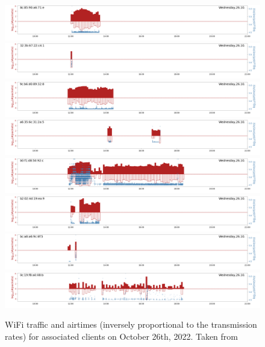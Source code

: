  \begin{figure}
      \includegraphics[width=\textwidth]{figures/Appendix/a.png}
      \includegraphics[width=\textwidth]{figures/Appendix/d299_32:3b:67:22:c4:1_pkts_shft.png}
      \includegraphics[width=\textwidth]{figures/Appendix/d299_9c:b6:d0:89:32:8_pkts_shft.png}
      \includegraphics[width=\textwidth]{figures/Appendix/d299_a6:35:6c:31:2a:5_pkts_shft.png}
      \includegraphics[width=\textwidth]{figures/Appendix/d299_b0:f1:d8:50:92:c_pkts_shft.png}
      \includegraphics[width=\textwidth]{figures/Appendix/d299_b2:02:4d:19:ea:9_pkts_shft.png}
      \includegraphics[width=\textwidth]{figures/Appendix/d299_bc:a8:a6:9c:6f:5_pkts_shft.png}
      \includegraphics[width=\textwidth]{figures/Appendix/d299-0c:19:f8:a0:08:b-pkts-shft.png}
      \caption[WiFi Traffic]{WiFi traffic and airtimes (inversely proportional to the transmission rates) for associated clients on October 26th, 2022.
      Taken from~\cite{SNCX_internal_note}}
      \label{fig:day299}
 \end{figure}


